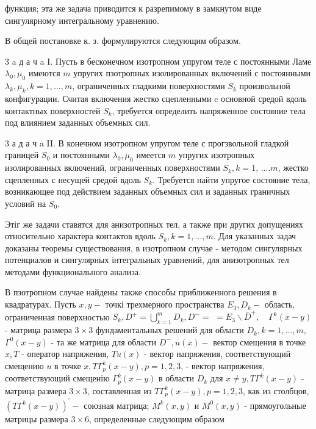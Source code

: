 \documentclass[10pt]{article}
\begin{document}
функция; эта же задача приводится к разрепимому в замкнутом виде сингулярному интегральному уравнению.



В общей постановке к. з. формулируются следующим образом.



3 a д а ч a I. Пусть в бесконечном изотропном упругом теле с постоянными Ламе $\lambda_{0}, \mu_{0}$ имеются $m$ упругих пзотропных изолированных включений с постоянными $\lambda_{k}, \mu_{k}, k=1, \ldots, m$, ограниченных гладкими поверхностями $S_{k}$ произвольной конфигурации. Считая включения жестко сцепленными c основной средой вдоль контактных поверхностей $S_{k}$, требуется определить напряженное состояние тела под влиянием заданных объемных сил.



3 а д а ч a II. В конечном изотропном упругом теле с прогзвольной гладкой границей $S_{0}$ и постоянными $\lambda_{0}, \mu_{0}$ имеется $m$ упругих изотропных изолированных включений, ограниченных поверхностями $S_{k}, k=1$, $\ldots . m$, жестко сцепленных с несущей средой вдоль $S_{k}$. Требуется найти упругое состояние тела, возникающее под действием заданных объемных сил и заданных граничных условий на $S_{0}$.



Этіг же задачи ставятся для анизотропных тел, а также при других допущениях относительно характера контактов вдоль $S_{k}, k=1, \ldots, m$. Для указанных задач доказаны теоремы существования, в изотропном случае - методом сингулярных потенциалов и сингулярных інтегральных уравнений, для анизотропных тел методами функционального анализа.



В пзотропном случае найдены также способы приближенного решения в квадратурах. Пусть $x, y-$ точкі трехмерного пространства $E_{3}, D_{k}-$ область, ограниченная поверхностью $S_{k}, D^{+}=\bigcup_{k=1}^{m} D_{k}, D^{-}=$ $=E_{3} \backslash \bar{D}^{+}, \quad \Gamma^{k}(x-y)$ - матрица размера $3 \times 3$ фундаментальных решений для области $D_{k}, k=1, \ldots, m$, $\Gamma^{0}(x-y)$ - та же матрица для области $D^{-}, u(x)-$ вектор смещения в точке $x, T$ - оператор напряжения, $T u(x)$ - вектор напряжения, соответствующий смещению $u$ в точке $x, T \Gamma_{p}^{k}(x-y), p=1,2,3$, - вектор напряжения, соответствующий смещенію $\Gamma_{p}^{k}(x-y)$ в области $D_{k}$ для $x \neq y, T \Gamma^{k}(x-y)$ - матрица размера $3 \times 3$, составленная из $T \Gamma_{p}^{k}(x-y), p=1,2,3$, как из столбцов, $\left(T \Gamma^{k}(x-y)\right)^{\prime}-$ союзная матрица; $M^{k}(x, y)$ и $M^{0}(x, y)$ - прямоугольные матрицы размера $3 \times 6$, определенные следующим образом
\end{document}
